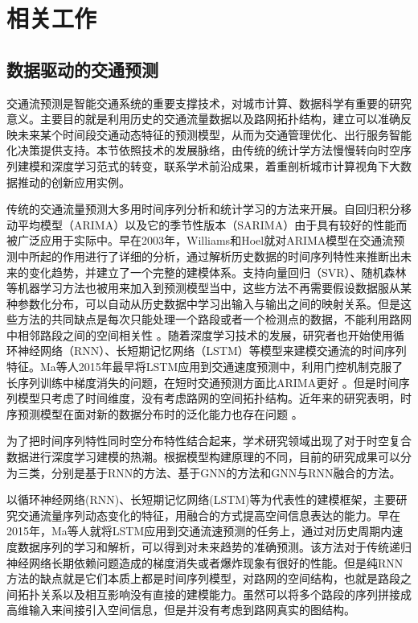 \chapter{相关工作}

\section{数据驱动的交通预测}

交通流预测是智能交通系统的重要支撑技术，对城市计算、数据科学有重要的研究意义。主要目的就是利用历史的交通流量数据以及路网拓扑结构，建立可以准确反映未来某个时间段交通动态特征的预测模型，从而为交通管理优化、出行服务智能化决策提供支持。本节依照技术的发展脉络，由传统的统计学方法慢慢转向时空序列建模和深度学习范式的转变，联系学术前沿成果，着重剖析城市计算视角下大数据推动的创新应用实例。

传统的交通流量预测大多用时间序列分析和统计学习的方法来开展。自回归积分移动平均模型（ARIMA）以及它的季节性版本（SARIMA）由于具有较好的性能而被广泛应用于实际中。早在2003年，Williams和Hoel就对ARIMA模型在交通流预测中所起的作用进行了详细的分析，通过解析历史数据的时间序列特性来推断出未来的变化趋势，并建立了一个完整的建模体系。支持向量回归（SVR）、随机森林等机器学习方法也被用来加入到预测模型当中，这些方法不再需要假设数据服从某种参数化分布，可以自动从历史数据中学习出输入与输出之间的映射关系。但是这些方法的共同缺点是每次只能处理一个路段或者一个检测点的数据，不能利用路网中相邻路段之间的空间相关性 。随着深度学习技术的发展，研究者也开始使用循环神经网络（RNN）、长短期记忆网络（LSTM）等模型来建模交通流的时间序列特征。Ma等人2015年最早将LSTM应用到交通速度预测中，利用门控机制克服了长序列训练中梯度消失的问题，在短时交通预测方面比ARIMA更好 。但是时间序列模型只考虑了时间维度，没有考虑路网的空间拓扑结构。近年来的研究表明，时序预测模型在面对新的数据分布时的泛化能力也存在问题 。

为了把时间序列特性同时空分布特性结合起来，学术研究领域出现了对于时空复合数据进行深度学习建模的热潮。根据模型构建原理的不同，目前的研究成果可以分为三类，分别是基于RNN的方法、基于GNN的方法和GNN与RNN融合的方法。

以循环神经网络(RNN)、长短期记忆网络(LSTM)等为代表性的建模框架，主要研究交通流量序列动态变化的特征，用融合的方式提高空间信息表达的能力。早在2015年，Ma等人就将LSTM应用到交通流速预测的任务上，通过对历史周期内速度数据序列的学习和解析，可以得到对未来趋势的准确预测。该方法对于传统递归神经网络长期依赖问题造成的梯度消失或者爆炸现象有很好的性能。但是纯RNN方法的缺点就是它们本质上都是时间序列模型，对路网的空间结构，也就是路段之间拓扑关系以及相互影响没有直接的建模能力。虽然可以将多个路段的序列拼接成高维输入来间接引入空间信息，但是并没有考虑到路网真实的图结构。


